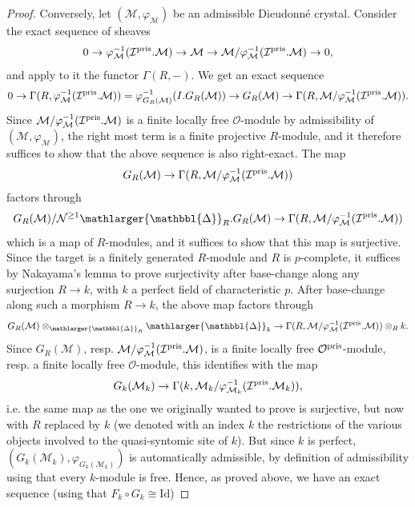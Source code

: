 \documentclass{amsart}
\newcommand{\prism}{{\mathlarger{\mathbbl{\Delta}}}}
\theoremstyle{plain}
\theoremstyle{definition}
\newcommand{\blue}[1]{{\color{black}#1}}
\begin{document}
{\begin{proof}
Conversely, let $(\mathcal{M},\varphi_{\mathcal{M}})$ be an admissible Dieudonn\'e crystal. Consider the exact sequence of sheaves
$$
0 \to \varphi_{\mathcal{M}}^{-1}(\mathcal{I}^{\rm pris}.\mathcal{M}) \to \mathcal{M} \to  \mathcal{M}/\varphi_{\mathcal{M}}^{-1}(\mathcal{I}^{\rm pris}.\mathcal{M}) \to 0,
$$
and apply to it the functor $\Gamma(R,-)$. We get an exact sequence
$$
0 \to \Gamma(R, \varphi_{\mathcal{M}}^{-1}(\mathcal{I}^{\rm pris}.\mathcal{M})) = \varphi_{G_R(\mathcal{M})}^{-1}(I.G_R(\mathcal{M})) \to G_R(\mathcal{M}) \to  \Gamma(R,\mathcal{M}/\varphi_{\mathcal{M}}^{-1}(\mathcal{I}^{\rm pris}.\mathcal{M})).
$$
Since $\mathcal{M}/\varphi_{\mathcal{M}}^{-1}(\mathcal{I}^{\rm pris}.\mathcal{M})$ is a finite locally free $\mathcal{O}$-module by admissibility of $(\mathcal{M},\varphi_{\mathcal{M}})$, the right most term is a finite projective $R$-module, and it therefore suffices to show that the above sequence is also right-exact. The map 
$$
G_R(\mathcal{M}) \to  \Gamma(R,\mathcal{M}/\varphi_{\mathcal{M}}^{-1}(\mathcal{I}^{\rm pris}.\mathcal{M}))
$$ 
factors through 
$$
G_R(\mathcal{M})/\mathcal{N}^{\geq 1} \prism_R. G_R(\mathcal{M}) \to  \Gamma(R,\mathcal{M}/\varphi_{\mathcal{M}}^{-1}(\mathcal{I}^{\rm pris}.\mathcal{M}))
$$
which is a map of $R$-modules, and it suffices to show that this map is surjective. Since the target is a finitely generated $R$-module and $R$ is $p$-complete, it suffices by Nakayama's lemma to prove surjectivity after base-change along any surjection $R \to k$, with $k$ a perfect field of characteristic $p$. After base-change along such a morphism $R \to k$, the above map factors through
$$
G_R(\mathcal{M}) \otimes_{\prism_R} \prism_k \to  \Gamma(R,\mathcal{M}/\varphi_{\mathcal{M}}^{-1}(\mathcal{I}^{\rm pris}.\mathcal{M})) \otimes_R k.
$$
Since $G_R(\mathcal{M})$, resp. $\mathcal{M}/\varphi_{\mathcal{M}}^{-1}(\mathcal{I}^{\rm pris}.\mathcal{M})$, is a finite locally free $\mathcal{O}^{\rm pris}$-module, resp. a finite locally free $\mathcal{O}$-module, this identifies with the map
$$
G_k(\mathcal{M}_k) \to \Gamma(k,\mathcal{M}_k/\varphi_{\mathcal{M}_k}^{-1}(\mathcal{I}^{\rm pris}.\mathcal{M}_k)),
$$  
i.e. the same map as the one we originally wanted to prove is surjective, but now with $R$ replaced by $k$ (we denoted with an index $k$ the restrictions of the various objects involved to the quasi-syntomic site of $k$). But since $k$ is perfect, $(G_k(\mathcal{M}_k),\varphi_{G_k(\mathcal{M}_k)})$ is automatically admissible, \blue{by definition of admissibility using that every $k$-module is free}. Hence, as proved above, we have an exact sequence (using that $F_k \circ G_k \cong \mathrm{Id}$)

\end{proof}}
\end{document}
